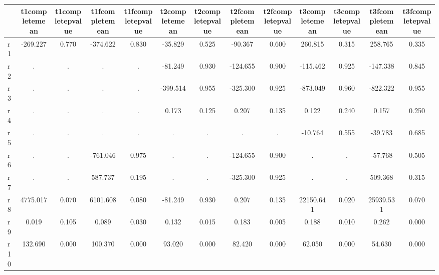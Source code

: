 \begin{table}[htbp]
\begin{tabular}{lcccccccccccc} \hline \hline
 & t1completemean  & t1completepvalue  & t1fcompletemean  & t1fcompletepvalue  & t2completemean  & t2completepvalue  & t2fcompletemean  & t2fcompletepvalue  & t3completemean  & t3completepvalue  & t3fcompletemean  & t3fcompletepvalue  \\  \hline 
r1 &  -269.227 &     0.770 &  -374.622 &     0.830 &   -35.829 &     0.525 &   -90.367 &     0.600 &   260.815 &     0.315 &   258.765 &     0.335 \\  
r2 &         . &         . &         . &         . &   -81.249 &     0.930 &  -124.655 &     0.900 &  -115.462 &     0.925 &  -147.338 &     0.845 \\  
r3 &         . &         . &         . &         . &  -399.514 &     0.955 &  -325.300 &     0.925 &  -873.049 &     0.960 &  -822.322 &     0.955 \\  
r4 &         . &         . &         . &         . &     0.173 &     0.125 &     0.207 &     0.135 &     0.122 &     0.240 &     0.157 &     0.250 \\  
r5 &         . &         . &         . &         . &         . &         . &         . &         . &   -10.764 &     0.555 &   -39.783 &     0.685 \\  
r6 &         . &         . &  -761.046 &     0.975 &         . &         . &  -124.655 &     0.900 &         . &         . &   -57.768 &     0.505 \\  
r7 &         . &         . &   587.737 &     0.195 &         . &         . &  -325.300 &     0.925 &         . &         . &   509.368 &     0.315 \\  
r8 &  4775.017 &     0.070 &  6101.608 &     0.080 &   -81.249 &     0.930 &     0.207 &     0.135 & 22150.641 &     0.020 & 25939.531 &     0.070 \\  
r9 &     0.019 &     0.105 &     0.089 &     0.030 &     0.132 &     0.015 &     0.183 &     0.005 &     0.188 &     0.010 &     0.262 &     0.000 \\  
r10 &   132.690 &     0.000 &   100.370 &     0.000 &    93.020 &     0.000 &    82.420 &     0.000 &    62.050 &     0.000 &    54.630 &     0.000 \\  
\hline \hline \end{tabular}
\end{table}

